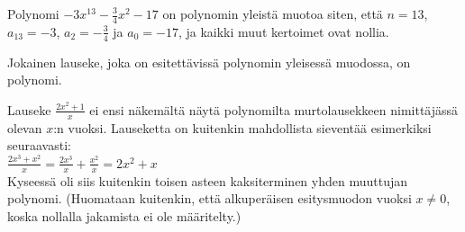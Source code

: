 \begin{esimerkki}

Polynomi $-3x^{13}-\frac{3}{4}x^2-17$ on polynomin yleistä muotoa siten, että $n=13$, $a_{13}=-3$, $a_2=-\frac{3}{4}$ ja $a_0=-17$, ja kaikki muut kertoimet ovat nollia.

\end{esimerkki}
 
Jokainen lauseke, joka on esitettävissä polynomin yleisessä muodossa, on polynomi.

\begin{esimerkki}

Lauseke $\frac{2x^2+1}{x}$ ei ensi näkemältä näytä polynomilta murtolausekkeen nimittäjässä olevan $x$:n vuoksi. Lauseketta on kuitenkin mahdollista sieventää esimerkiksi seuraavasti: \\


$\frac{2x^3+x^2}{x} = \frac{2x^3}{x}+\frac{x^2}{x} = 2x^2+x $ \\

Kyseessä oli siis kuitenkin toisen asteen kaksiterminen yhden muuttujan polynomi. (Huomataan kuitenkin, että alkuperäisen esitysmuodon vuoksi $x \neq 0$, koska nollalla jakamista ei ole määritelty.)

\end{esimerkki}

